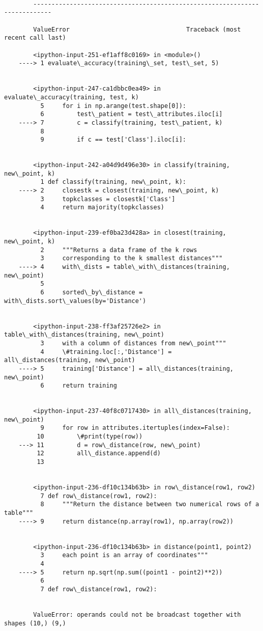 \documentclass[11pt]{article}
\begin{document}
    \begin{Verbatim}[commandchars=\\\{\}]

        ---------------------------------------------------------------------------

        ValueError                                Traceback (most recent call last)

        <ipython-input-251-ef1aff8c0169> in <module>()
    ----> 1 evaluate\_accuracy(training\_set, test\_set, 5)
    

        <ipython-input-247-ca1dbbc0ea49> in evaluate\_accuracy(training, test, k)
          5     for i in np.arange(test.shape[0]):
          6         test\_patient = test\_attributes.iloc[i]
    ----> 7         c = classify(training, test\_patient, k)
          8 
          9         if c == test['Class'].iloc[i]:


        <ipython-input-242-a04d9d496e30> in classify(training, new\_point, k)
          1 def classify(training, new\_point, k):
    ----> 2     closestk = closest(training, new\_point, k)
          3     topkclasses = closestk['Class']
          4     return majority(topkclasses)


        <ipython-input-239-ef0ba23d428a> in closest(training, new\_point, k)
          2     """Returns a data frame of the k rows 
          3     corresponding to the k smallest distances"""
    ----> 4     with\_dists = table\_with\_distances(training, new\_point)
          5 
          6     sorted\_by\_distance = with\_dists.sort\_values(by='Distance')


        <ipython-input-238-ff3af25726e2> in table\_with\_distances(training, new\_point)
          3     with a column of distances from new\_point"""
          4     \#training.loc[:,'Distance'] = all\_distances(training, new\_point)
    ----> 5     training['Distance'] = all\_distances(training, new\_point)
          6     return training


        <ipython-input-237-40f8c0717430> in all\_distances(training, new\_point)
          9     for row in attributes.itertuples(index=False):
         10         \#print(type(row))
    ---> 11         d = row\_distance(row, new\_point)
         12         all\_distance.append(d)
         13 


        <ipython-input-236-df10c134b63b> in row\_distance(row1, row2)
          7 def row\_distance(row1, row2):
          8     """Return the distance between two numerical rows of a table"""
    ----> 9     return distance(np.array(row1), np.array(row2))
    

        <ipython-input-236-df10c134b63b> in distance(point1, point2)
          3     each point is an array of coordinates"""
          4 
    ----> 5     return np.sqrt(np.sum((point1 - point2)**2))
          6 
          7 def row\_distance(row1, row2):


        ValueError: operands could not be broadcast together with shapes (10,) (9,) 

    \end{Verbatim}
\end{document}
